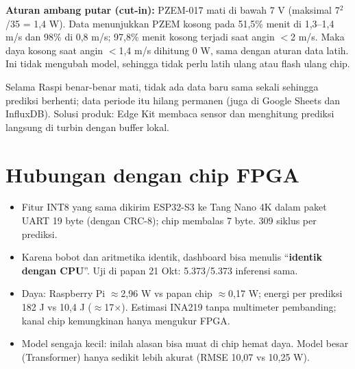 \documentclass[10.5pt,a4paper]{article}
\begin{document}
\textbf{Aturan ambang putar (cut-in):} PZEM-017 mati di bawah 7 V (maksimal 7$^2$/35 = 1,4 W). Data menunjukkan PZEM kosong pada 51,5\% menit di
1,3--1,4 m/s dan 98\% di 0,8 m/s; 97,8\% menit kosong terjadi saat angin $<$2 m/s. Maka daya kosong saat angin $<$1,4 m/s dihitung 0 W, sama dengan
aturan data latih. Ini tidak mengubah model, sehingga tidak perlu latih ulang atau flash ulang chip.

\begin{perhatian}
Selama Raspi benar-benar mati, tidak ada data baru sama sekali sehingga prediksi berhenti; data periode itu hilang permanen (juga di
Google Sheets dan InfluxDB). Solusi produk: Edge Kit membaca sensor dan menghitung prediksi langsung di turbin dengan buffer lokal.
\end{perhatian}

\section{Hubungan dengan chip FPGA}
\begin{itemize}
  \item Fitur INT8 yang sama dikirim ESP32-S3 ke Tang Nano 4K dalam paket UART 19 byte (dengan CRC-8); chip membalas 7 byte. 309 siklus per prediksi.
  \item Karena bobot dan aritmetika identik, dashboard bisa menulis ``\textbf{identik dengan CPU}''. Uji di papan 21 Okt: 5.373/5.373 inferensi sama.
  \item Daya: Raspberry Pi $\approx$2,96 W vs papan chip $\approx$0,17 W; energi per prediksi 182 J vs 10,4 J ($\approx$17$\times$). Estimasi INA219 tanpa
        multimeter pembanding; kanal chip kemungkinan hanya mengukur FPGA.
  \item Model sengaja kecil: inilah alasan bisa muat di chip hemat daya. Model besar (Transformer) hanya sedikit lebih akurat (RMSE 10,07 vs 10,25 W).
\end{itemize}
\end{document}
